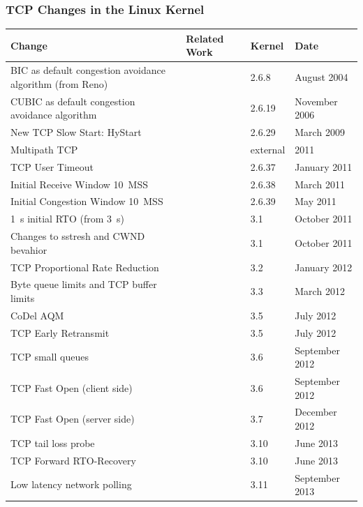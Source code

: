 \documentclass{beamer}
\begin{document}
\begin{frame}
	\frametitle{TCP Changes in the Linux Kernel}
		\tiny
		\begin{tabu}{X[1.4]X[0.4]X[0.4]X[0.7]}
		\toprule
		\textbf{Change} & \textbf{Related Work} & \textbf{Kernel} & \textbf{Date} \\
		\midrule
		BIC as default congestion avoidance algorithm (from Reno) & & 2.6.8 & August 2004 \\
		CUBIC as default congestion avoidance algorithm & \cite{ha2008cubic} & 2.6.19 & November 2006 \\
		New TCP Slow Start: HyStart & \cite{Ha20112092} & 2.6.29 & March 2009 \\
		Multipath TCP & \cite{rfc6824} & external & 2011 \\
		TCP User Timeout & \cite{rfc5482} & 2.6.37 & January 2011 \\
		Initial Receive Window \SI{10}{MSS} & \cite{rfc6928} & 2.6.38 & March 2011 \\
		Initial Congestion Window \SI{10}{MSS} & \cite{rfc6928} & 2.6.39 & May 2011 \\
		\SI{1}{\second} initial RTO (from \SI{3}{\second}) & \cite{rfc6298} & 3.1 & October 2011 \\
		Changes to sstresh and CWND bevahior & \cite{rfc5681} & 3.1 & October 2011 \\ %
		TCP Proportional Rate Reduction & \cite{rfc6937} & 3.2 & January 2012 \\
		Byte queue limits and TCP buffer limits &  & 3.3 & March 2012 \\ %
		CoDel AQM & \cite{nichols2014codel} & 3.5 & July 2012 \\
		TCP Early Retransmit & \cite{rfc5827} & 3.5 & July 2012 \\
		TCP small queues & & 3.6 & September 2012 \\ %
		TCP Fast Open (client side) & \cite{cheng2014tcptfo} & 3.6 & September 2012 \\
		TCP Fast Open (server side) & & 3.7 & December 2012 \\
		TCP tail loss probe & & 3.10 & June 2013 \\ %
		TCP Forward RTO-Recovery & \cite{rfc5682} & 3.10 & June 2013 \\
		Low latency network polling & & 3.11 & September 2013 \\ %

\end{tabu}
\end{frame}
\end{document}
